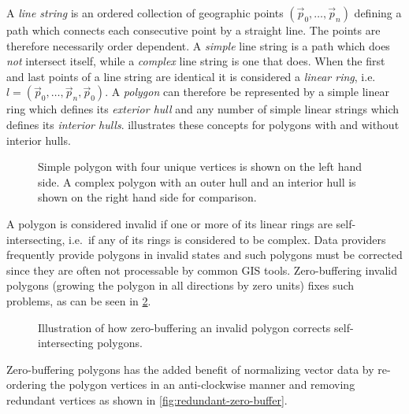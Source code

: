 A \textit{line string} is an ordered collection of geographic points $(\vec{p}_0, \ldots, \vec{p}_n)$ defining a path which connects each consecutive point by a straight line.
The points are therefore necessarily order dependent.
A \textit{simple} line string is a path which does \textit{not} intersect itself, while a \textit{complex} line string is one that does.
When the first and last points of a line string are identical it is considered a \textit{linear ring}, i.e.\ $l = (\vec{p}_0, \ldots, \vec{p}_n, \vec{p}_0)$.
A \textit{polygon} can therefore be represented by a simple linear ring which defines its \textit{exterior hull} and any number of simple linear strings which defines its \textit{interior hulls}.
 illustrates these concepts for polygons with and without interior hulls. %

\begin{figure}[H]
  \centering
  
  \hspace{2em}
  \textcolor{gray}{\vrule}
  \hspace{0.01\linewidth}
  
  \caption[Types of vectorized polygons.]{%
    Simple polygon with four unique vertices is shown on the left hand side.
    A complex polygon with an outer hull
    and an interior hull is shown on the right hand side for comparison.
  }%
  \label{fig:polygon-representation}
\end{figure}

A polygon is considered invalid if one or more of its linear rings are self-intersecting, i.e.\ if any of its rings is considered to be complex.
Data providers frequently provide polygons in invalid states and such polygons must be corrected since they are often not processable by common GIS tools.
Zero-buffering invalid polygons (growing the polygon in all directions by zero units) fixes such problems, as can be seen in \cref{fig:complex-zero-buffer}.

\begin{figure}[H]
  \centering
  
  \caption{Illustration of how zero-buffering an invalid polygon corrects self-intersecting polygons.}%
  \label{fig:complex-zero-buffer}
\end{figure}

Zero-buffering polygons has the added benefit of normalizing vector data by re-ordering the polygon vertices in an anti-clockwise manner and removing redundant vertices as shown in \cref{fig:redundant-zero-buffer}.

